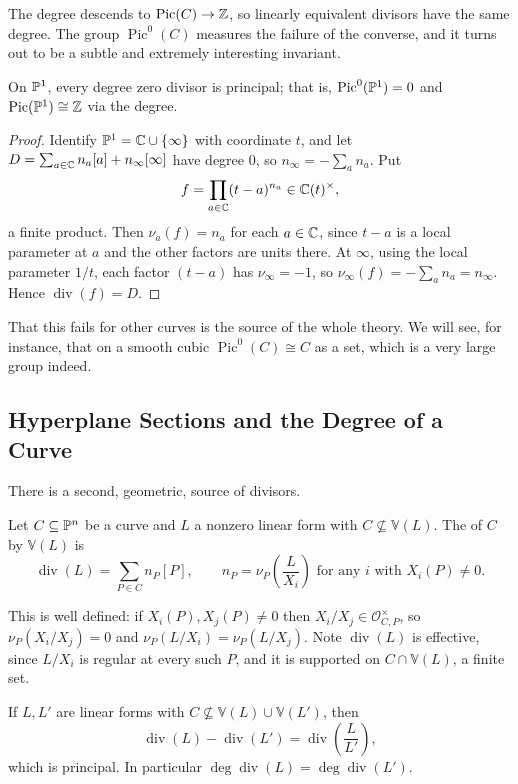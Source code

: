 \documentclass[a4paper]{scrartcl}
\newcommand{\V}{\mathbb{V}}
\newcommand{\Oh}{\mathcal{O}}
\DeclareMathOperator{\Divv}{div}
\DeclareMathOperator{\Pic}{Pic}
\begin{document}
The degree descends to $\Pic(C) \to \Z$, so linearly equivalent divisors have the same degree. The group $\Pic^0(C)$ measures the failure of the converse, and it turns out to be a subtle and extremely interesting invariant.

\begin{proposition}\label{prop:picP1}
	On $\mathbb{P}^1$, every degree zero divisor is principal; that is, $\Pic^0(\PP^1) = 0$ and $\Pic(\PP^1)\cong\Z$ via the degree.
\end{proposition}

\begin{proof}
	Identify $\mathbb{P}^1 = \mathbb{C}\cup\{\infty\}$ with coordinate $t$, and let $D = \sum_{a\in\mathbb{C}}n_a[a] + n_\infty[\infty]$ have degree $0$, so $n_\infty = -\sum_a n_a$. Put
	$$f = \prod_{a \in \mathbb{C}}(t-a)^{n_a} \in \mathbb{C}(t)^\times,$$
	a finite product. Then $\nu_a(f) = n_a$ for each $a \in \mathbb{C}$, since $t-a$ is a local parameter at $a$ and the other factors are units there. At $\infty$, using the local parameter $1/t$, each factor $(t-a)$ has $\nu_\infty = -1$, so $\nu_\infty(f) = -\sum_a n_a = n_\infty$. Hence $\Divv(f) = D$.
\end{proof}

That this fails for other curves is the source of the whole theory. We will see, for instance, that on a smooth cubic $\Pic^0(C) \cong C$ as a set, which is a very large group indeed.

\subsection{Hyperplane Sections and the Degree of a Curve}

There is a second, geometric, source of divisors.

\begin{definition}
	Let $C \subseteq \mathbb{P}^n$ be a curve and $L$ a nonzero linear form with $C \not\subseteq \V(L)$. The  of $C$ by $\V(L)$ is
	$$\Divv(L) = \sum_{P\in C} n_P[P], \qquad n_P = \nu_P\!\left(\frac{L}{X_i}\right) \text{ for any } i \text{ with } X_i(P)\neq 0.$$
\end{definition}

This is well defined: if $X_i(P), X_j(P) \neq 0$ then $X_i/X_j \in \Oh_{C,P}^\times$, so $\nu_P(X_i/X_j) = 0$ and $\nu_P(L/X_i) = \nu_P(L/X_j)$. Note $\Divv(L)$ is effective, since $L/X_i$ is regular at every such $P$, and it is supported on $C \cap \V(L)$, a finite set.

\begin{proposition}\label{prop:hyperplanediv}
	If $L,L'$ are linear forms with $C \not\subseteq \V(L)\cup\V(L')$, then
	$$\Divv(L) - \Divv(L') = \Divv\!\left(\frac{L}{L'}\right),$$
	which is principal. In particular $\deg\Divv(L) = \deg\Divv(L')$.
\end{proposition}
\end{document}
